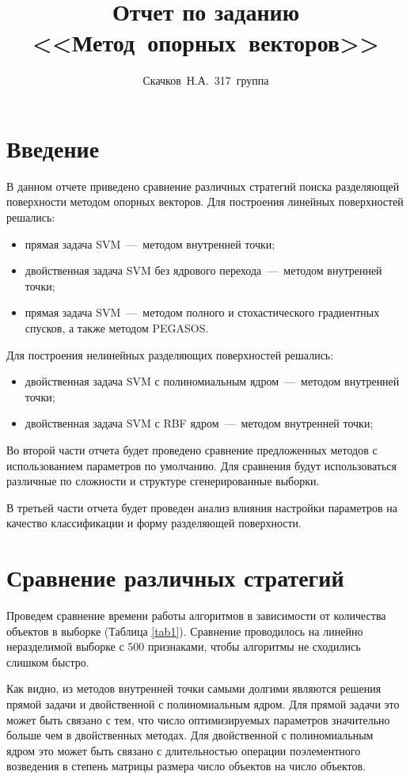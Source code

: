 \documentclass[12pt,fleqn,unicode]{article}
\title{Отчет по заданию <<Метод~опорных~векторов>>}
\author{Скачков~Н.А.~317~группа}
\begin{document}
	\maketitle

\section{Введение}
В данном отчете приведено сравнение различных стратегий поиска разделяющей поверхности
методом опорных векторов. Для построения линейных поверхностей решались:
\begin{itemize}
	\item прямая задача SVM~---~методом внутренней точки;
	\item двойственная задача SVM без ядрового перехода~---~методом внутренней точки;
	\item прямая задача SVM~---~методом полного и стохастического градиентных спусков,
		 а также методом PEGASOS.
\end{itemize}

Для построения нелинейных разделяющих поверхностей решались:
\begin{itemize}
	\item двойственная задача SVM с полиномиальным ядром~---~методом внутренней точки;
	\item двойственная задача SVM с RBF ядром~---~методом внутренней точки;
\end{itemize}

Во второй части отчета будет проведено сравнение предложенных методов с использованием
параметров по умолчанию. Для сравнения будут использоваться различные по сложности и
структуре сгенерированные выборки.

В третьей части отчета будет проведен анализ влияния настройки параметров на качество
классификации и форму разделяющей поверхности.

\section{Сравнение различных стратегий}
Проведем сравнение времени работы алгоритмов в зависимости от количества объектов в выборке
(Таблица \ref{tab1}). Сравнение проводилось на линейно неразделимой выборке с 500 признаками,
чтобы алгоритмы не сходились слишком быстро.

Как видно, из методов внутренней точки самыми долгими являются решения прямой задачи и двойственной
с полиномиальным ядром. Для прямой задачи это может быть связано с тем, что число оптимизируемых 
параметров значительно больше чем в двойственных методах. Для двойственной с полиномиальным ядром
это может быть связано с длительностью операции поэлементного возведения в степень матрицы размера
число объектов на число объектов.
\end{document}
